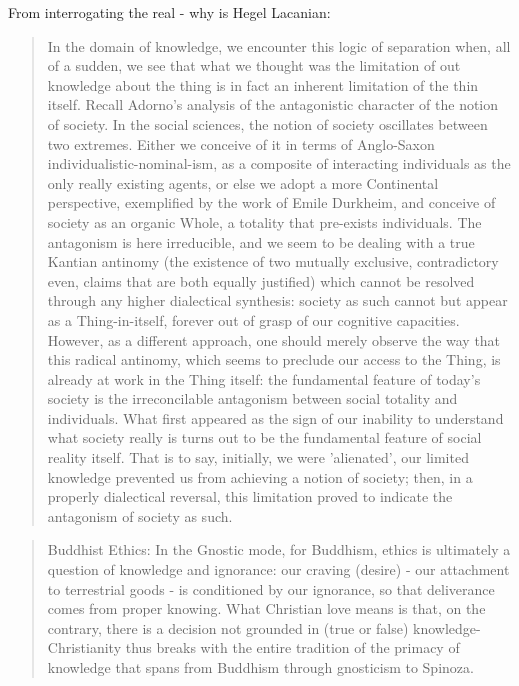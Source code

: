 \documentclass{book}
\begin{document}
From interrogating the real - why is Hegel Lacanian:
\begin{quotation}
In the domain of knowledge, we encounter this logic of separation when, all of a sudden, we see that what we thought was the limitation of out knowledge about the thing is in fact an inherent limitation of the thin itself. Recall Adorno's analysis of the antagonistic character of the notion of society. In the social sciences, the notion of society oscillates between two extremes. Either we conceive of it in terms of Anglo-Saxon individualistic-nominal-ism, as a composite of interacting individuals as the only really existing agents, or else we adopt a more Continental perspective, exemplified by the work of Emile Durkheim, and conceive of society as an organic Whole, a totality that pre-exists individuals. The antagonism is here irreducible, and we seem to be dealing with a true Kantian antinomy (the existence of two mutually exclusive, contradictory even, claims that are both equally justified) which cannot be resolved through any higher dialectical synthesis: society as such cannot but appear as a Thing-in-itself, forever out of grasp of our cognitive capacities. However, as a different approach, one should merely observe the way that this radical antinomy, which seems to preclude our access to the Thing, is already at work in the Thing itself: the fundamental feature of today's society is the irreconcilable antagonism between social totality and individuals. What first appeared as the sign of our inability to understand what society really is turns out to be the fundamental feature of social reality itself. That is to say, initially, we were 'alienated', our limited knowledge prevented us from achieving a notion of society; then, in a properly dialectical reversal, this limitation proved to indicate the antagonism of society as such.
\end{quotation}
\begin{quotation}
Buddhist Ethics: In the Gnostic mode, for Buddhism, ethics is ultimately a question of knowledge and ignorance: our craving (desire) - our attachment to terrestrial goods - is conditioned by our ignorance, so that deliverance comes from proper knowing. What Christian love means is that, on the contrary, there is a decision not grounded in (true or false) knowledge- Christianity thus breaks with the entire tradition of the primacy of knowledge that spans from Buddhism through gnosticism to Spinoza.
\end{quotation}
\end{document}
